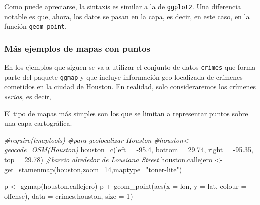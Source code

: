 \documentclass[
]{article}
\newenvironment{Shaded}{\begin{snugshade}}{\end{snugshade}}
\newcommand{\AttributeTok}[1]{\textcolor[rgb]{0.77,0.63,0.00}{#1}}
\newcommand{\CommentTok}[1]{\textcolor[rgb]{0.56,0.35,0.01}{\textit{#1}}}
\newcommand{\DecValTok}[1]{\textcolor[rgb]{0.00,0.00,0.81}{#1}}
\newcommand{\FloatTok}[1]{\textcolor[rgb]{0.00,0.00,0.81}{#1}}
\newcommand{\FunctionTok}[1]{\textcolor[rgb]{0.00,0.00,0.00}{#1}}
\newcommand{\NormalTok}[1]{#1}
\newcommand{\OtherTok}[1]{\textcolor[rgb]{0.56,0.35,0.01}{#1}}
\newcommand{\SpecialCharTok}[1]{\textcolor[rgb]{0.00,0.00,0.00}{#1}}
\newcommand{\StringTok}[1]{\textcolor[rgb]{0.31,0.60,0.02}{#1}}
\numberwithin{ejcnt}{section}
\begin{document}
\begin{verbatim}
\end{verbatim}

Como puede apreciarse, la sintaxis es similar a la de \texttt{ggplot2}. Una diferencia notable es que, ahora, los datos se pasan en la capa, es decir, en este caso, en la función \texttt{geom\_point}.

\hypertarget{muxe1s-ejemplos-de-mapas-con-puntos}{%
\subsubsection{Más ejemplos de mapas con puntos}\label{muxe1s-ejemplos-de-mapas-con-puntos}}

En los ejemplos que siguen se va a utilizar el conjunto de datos \texttt{crimes} que forma parte del paquete \texttt{ggmap} y que incluye información geo-localizada de crímenes cometidos en la ciudad de Houston. En realidad, solo consideraremos los crímenes \emph{serios}, es decir,

\begin{Shaded}
\end{Shaded}

El tipo de mapas más simples son los que se limitan a representar puntos sobre una capa cartográfica.

\begin{Shaded}
\begin{Highlighting}[]
\CommentTok{\#require(tmaptools) \#para geolocalizar Houston}
\CommentTok{\#houston\textless{}{-}geocode\_OSM(\textquotesingle{}Houston\textquotesingle{})}
\NormalTok{houston}\OtherTok{=}\FunctionTok{c}\NormalTok{(}\AttributeTok{left =} \SpecialCharTok{{-}}\FloatTok{95.4}\NormalTok{, }\AttributeTok{bottom =} \FloatTok{29.74}\NormalTok{, }\AttributeTok{right =} \SpecialCharTok{{-}}\FloatTok{95.35}\NormalTok{, }\AttributeTok{top =} \FloatTok{29.78}\NormalTok{) }\CommentTok{\#barrio alrededor de Lousiana Street}
\NormalTok{houston.callejero }\OtherTok{\textless{}{-}} \FunctionTok{get\_stamenmap}\NormalTok{(houston,}\AttributeTok{zoom=}\DecValTok{14}\NormalTok{,}\AttributeTok{maptype=}\StringTok{"toner{-}lite"}\NormalTok{)}

\NormalTok{p }\OtherTok{\textless{}{-}} \FunctionTok{ggmap}\NormalTok{(houston.callejero)}
\NormalTok{p }\SpecialCharTok{+} \FunctionTok{geom\_point}\NormalTok{(}\FunctionTok{aes}\NormalTok{(}\AttributeTok{x =}\NormalTok{ lon, }\AttributeTok{y =}\NormalTok{ lat, }\AttributeTok{colour =}\NormalTok{ offense), }\AttributeTok{data =}\NormalTok{ crimes.houston, }\AttributeTok{size =} \DecValTok{1}\NormalTok{)}
\end{Highlighting}
\end{Shaded}
\end{document}
